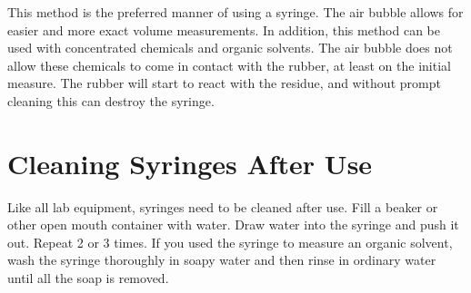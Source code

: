 This method is the preferred manner of using a syringe. The air bubble allows for easier and more exact volume measurements. In addition, this method can be used with concentrated chemicals and organic solvents. The air bubble does not allow these chemicals to come in contact with the rubber, at least on the initial measure. The rubber will start to react with the residue, and without prompt cleaning this can destroy the syringe.
 
\section{Cleaning Syringes After Use}

Like all lab equipment, syringes need to be cleaned after use. Fill a beaker or other open mouth container with water. Draw water into the syringe and push it out. Repeat 2 or 3 times. If you used the syringe to measure an organic solvent, wash the syringe thoroughly in soapy water and then rinse in ordinary water until all the soap is removed.

